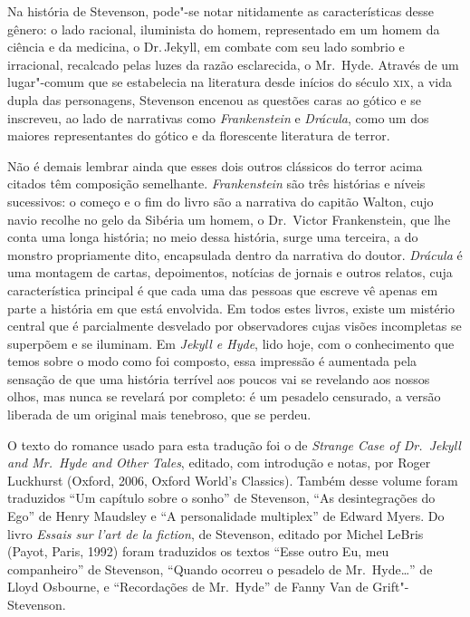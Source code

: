 Na história de Stevenson, pode"-se notar nitidamente as características desse gênero: o lado racional, iluminista do homem, representado em um homem da ciência e da medicina, o Dr.\,Jekyll, em combate com seu lado sombrio e irracional, recalcado pelas luzes da razão esclarecida, o Mr.\, Hyde. Através de um lugar"-comum que se estabelecia na literatura desde inícios do século \textsc{xix}, a vida dupla das personagens, Stevenson encenou as questões caras ao gótico e se inscreveu, ao lado de narrativas como \textit{Frankenstein} e \textit{Drácula}, como um dos maiores representantes do gótico e da florescente literatura de terror.


Não é demais lembrar ainda que esses dois outros clássicos do terror acima citados
têm composição semelhante.  \textit{Frankenstein}
são três histórias e níveis sucessivos: o começo e o fim do livro são a
narrativa do capitão Walton, cujo navio recolhe no gelo da Sibéria um
homem, o Dr.~Victor Frankenstein, que lhe conta uma longa história; no
meio dessa história, surge uma terceira, a do monstro propriamente
dito, encapsulada dentro da narrativa do doutor.  \textit{Drácula} é
uma montagem de cartas, depoimentos, notícias de jornais e outros
relatos, cuja característica principal é que cada uma das pessoas que
escreve vê apenas em parte a história em que está envolvida.  Em todos
estes livros, existe um mistério central que é parcialmente desvelado
por observadores cujas visões incompletas se superpõem e se iluminam. 
Em \textit{Jekyll e Hyde}, lido hoje, com o
conhecimento que temos sobre o modo como foi composto, essa impressão é
aumentada pela sensação de que uma história terrível aos poucos vai se
revelando aos nossos olhos, mas nunca se revelará por completo: é um
pesadelo censurado, a versão liberada de um original mais tenebroso,
que se perdeu.\linebreak


\noindent O texto do romance usado para esta tradução foi o de \textit{Strange Case 
of Dr.~Jekyll and Mr.~Hyde and Other Tales}, editado, com introdução 
e notas, por Roger Luckhurst (Oxford, 2006, Oxford World’s Classics). 
Também desse volume foram traduzidos “Um capítulo sobre o sonho” de 
Stevenson, “As desintegrações do Ego” de Henry Maudsley e “A personalidade 
multiplex” de Edward Myers.  Do livro \textit{Essais sur l’art de la fiction}, de 
Stevenson, editado por Michel LeBris (Payot, Paris, 1992) foram 
traduzidos os textos “Esse outro Eu, meu companheiro” de Stevenson, “Quando 
ocorreu o pesadelo de Mr.~Hyde\ldots{}” de Lloyd Osbourne, 
e “Recordações de Mr.~Hyde” de Fanny Van de Grift"-Stevenson.

